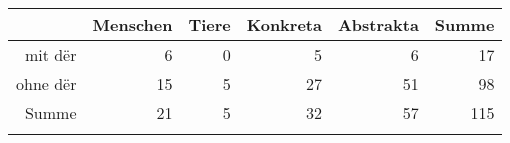 \begin{tabular}{rrrrrr}
  \lsptoprule
 & Menschen & Tiere & Konkreta & Abstrakta & Summe \\ 
  \midrule
mit dër & 6 & 0 & 5 & 6 & 17 \\ 
  ohne dër & 15 & 5 & 27 & 51 & 98 \\ 
  Summe & 21 & 5 & 32 & 57 & 115 \\ 
   \lspbottomrule
\end{tabular}
